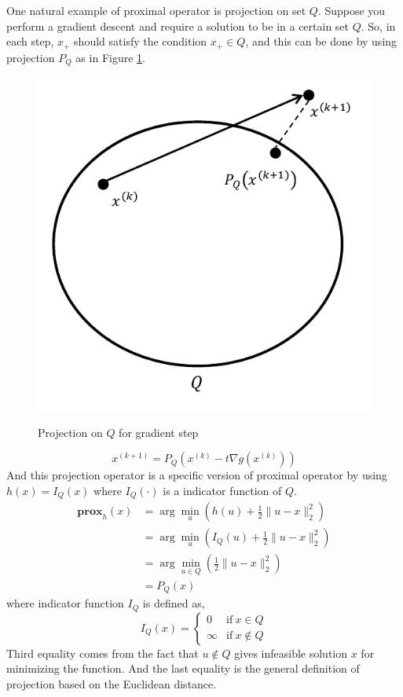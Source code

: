 \documentclass[12pt]{report}
\begin{document}
One natural example of proximal operator is projection on set $Q$. Suppose you perform a gradient descent and require a solution to be in a certain set $Q$. So, in each step, $x_{+}$ should satisfy the condition $x_{+}\in Q$, and this can be done by using projection $P_Q$ as in Figure \ref{16fig:projection}.
\begin{figure}[t]
    \centering
    \includegraphics[scale=0.8]{L16_fig_projection}\\
    \caption{Projection on $Q$ for gradient step}\label{16fig:projection}
\end{figure}
\begin{equation}
x^{(k+1)} = P_Q \left( x^{(k)}-t \nabla g(x^{(k)})\right)
\end{equation}
And this projection operator is a specific version of proximal operator by using $h(x)=I_Q (x)$ where $I_Q(\cdot )$ is a indicator function of $Q$.
\begin{align*}
\textbf{prox}_h (x) &= \arg\min_u \left( h(u) + \frac{1}{2}\|u-x\|_2^2 \right)\\
&= \arg\min_u \left( I_Q (u) + \frac{1}{2}\|u-x\|_2^2 \right)\\
&= \arg\min_{u \in Q} \left( \frac{1}{2}\|u-x\|_2^2 \right)\\
&= P_Q (x)
\end{align*}
where indicator function $I_Q$ is defined as, 
\begin{equation*}
I_Q (x) =  \begin{cases}
	0 & \text{if}~x \in Q \\
	\infty & \text{if}~x \notin Q
	\end{cases}  
\end{equation*}
Third equality comes from the fact that $u\notin Q$ gives infeasible solution $x$ for minimizing the function. And the last equality is the general definition of projection based on the Euclidean distance.
\end{document}
